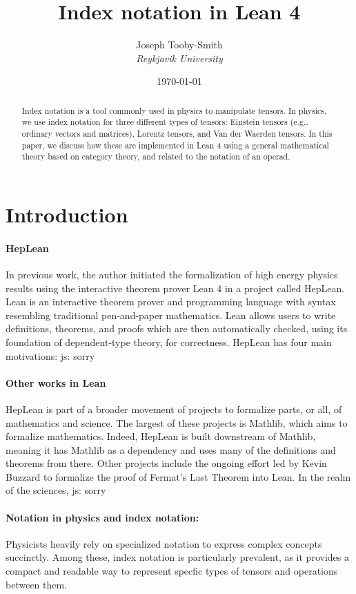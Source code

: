 \documentclass[a4paper, 11pt]{article}
\title{Index notation in Lean 4}
\author{Joseph Tooby-Smith \\ \textit{Reykjavik University}}
\date{\today}
\newcommand{\js}[1]{ {\color{magenta} js:  #1}}
\begin{document}
\maketitle
\vspace{-1cm}
\begin{abstract}
Index notation is a tool commonly used in physics to manipulate tensors.
In physics, we use index notation for three different types of tensors: 
Einstein tensors (e.g., ordinary vectors and matrices), Lorentz tensors, and 
Van der Waerden tensors. In this paper, we discuss how these are implemented in Lean 4 using a 
general mathematical theory based on category theory, and related to the notation of an operad.
\end{abstract}

\section{Introduction}

\paragraph{HepLean} In previous work, the author initiated the formalization of high energy physics 
results using the interactive theorem prover Lean 4 in a project called HepLean. 
Lean is an interactive theorem prover and 
programming language with syntax resembling traditional pen-and-paper mathematics. 
Lean allows users to write definitions, theorems, and proofs 
which are then automatically checked, using its foundation of dependent-type theory, for correctness.
HepLean has four main motivations: \js{sorry}

\paragraph{Other works in Lean} HepLean is part of a broader movement of projects
to formalize parts, or all, of 
mathematics and science. The largest of these projects is Mathlib, which aims to formalize
mathematics. Indeed, HepLean is built downstream of Mathlib, meaning it has Mathlib as a 
dependency and uses many of the definitions and theorems from there. 
Other projects include the ongoing effort led by Kevin Buzzard to formalize the proof of Fermat's
Last Theorem into Lean. 
In the realm of the sciences, \js{sorry}

\paragraph{Notation in physics and index notation:}
Physicists heavily rely on specialized notation to express complex concepts succinctly. 
Among these, index notation is particularly prevalent,
 as it provides a compact and readable way to represent specfic types of tensors and operations
 between them.
\end{document}
